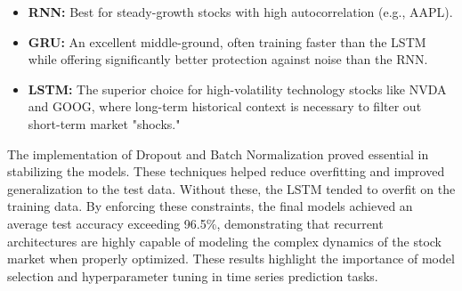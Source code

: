 \documentclass{article}
\begin{document}
\begin{itemize}
    \item \textbf{RNN:} Best for steady-growth stocks with high autocorrelation (e.g., AAPL).
    \item \textbf{GRU:} An excellent middle-ground, often training faster than the LSTM while offering significantly better protection against noise than the RNN.
    \item \textbf{LSTM:} The superior choice for high-volatility technology stocks like NVDA and GOOG, where long-term historical context is necessary to filter out short-term market "shocks."
\end{itemize}

The implementation of Dropout and Batch Normalization proved essential in stabilizing the models. These techniques helped reduce overfitting and improved generalization to the test data. Without these, the LSTM tended to overfit on the training data. By enforcing these constraints, the final models achieved an average test accuracy exceeding 96.5\%, demonstrating that recurrent architectures are highly capable of modeling the complex dynamics of the stock market when properly optimized. These results highlight the importance of model selection and hyperparameter tuning in time series prediction tasks.
\end{document}

